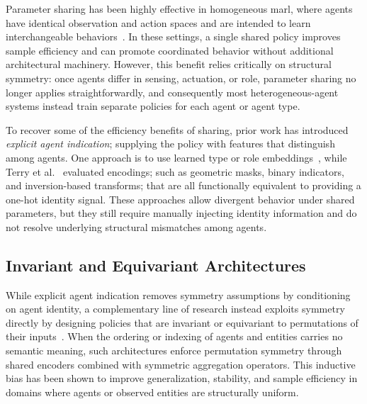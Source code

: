Parameter sharing has been highly effective in homogeneous \gls{marl},
where agents have identical observation and action spaces and are intended
to learn interchangeable behaviors~\cite{gupta2017, foerster2018}.
In these settings, a single shared policy improves sample efficiency and
can promote coordinated behavior without additional architectural machinery.
However, this benefit relies critically on structural symmetry:
once agents differ in sensing, actuation, or role, parameter sharing
no longer applies straightforwardly, and consequently most heterogeneous-agent
systems instead train separate policies for each agent or agent type.

To recover some of the efficiency benefits of sharing, 
prior work has introduced \emph{explicit agent indication};
supplying the policy with features that distinguish among agents.
One approach is to use learned type or role embeddings~\cite{christianos2021, albrecht2024}, 
while Terry et al.~\cite{terry2020} evaluated encodings; 
such as geometric masks, binary indicators, and inversion-based transforms; 
that are all functionally equivalent to providing a one-hot identity signal.
These approaches allow divergent behavior under shared parameters, 
but they still require manually injecting identity information and 
do not resolve underlying structural mismatches among agents.

\subsection{Invariant and Equivariant Architectures}

While explicit agent indication removes symmetry assumptions by conditioning on agent identity,
a complementary line of research instead exploits symmetry directly by designing policies that are
invariant or equivariant to permutations of their inputs~\cite{zaheer2017, yang2018}.
When the ordering or indexing of agents and entities carries no semantic meaning,
such architectures enforce permutation symmetry through shared encoders combined with
symmetric aggregation operators.
This inductive bias has been shown to improve generalization, stability, and sample efficiency
in domains where agents or observed entities are structurally uniform.

